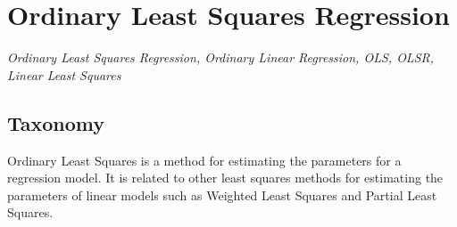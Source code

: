 
\section{Ordinary Least Squares Regression} 
\label{sec:ordinary}

\emph{Ordinary Least Squares Regression, Ordinary Linear Regression, OLS, OLSR, Linear Least Squares}

\subsection{Taxonomy}
Ordinary Least Squares is a method for estimating the parameters for a regression model.
It is related to other least squares methods for estimating the parameters of linear models such as Weighted Least Squares and Partial Least Squares.


